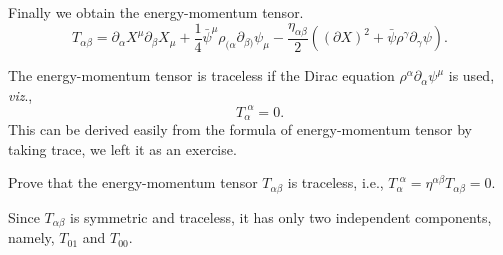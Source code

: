 \documentclass[graybox,envcountchap,sectrefs]{svmono}
\begin{document}
Finally we obtain the energy-momentum tensor.
\begin{equation}\boxed{
T_{\alpha\beta}=\partial_{\alpha} X^{\mu} \partial_{\beta} X_{\mu}
+\frac{1}{4} \bar{\psi}^{\mu} \rho_{(\alpha} \partial_{\beta)} \psi_{\mu}
-\frac{\eta_{\alpha \beta}}{2}\left((\partial X)^{2}+\bar{\psi} \rho^{\gamma} \partial_{\gamma} \psi\right).	}
\end{equation}


The energy-momentum tensor is traceless if the Dirac equation $\rho^{\alpha}\partial_{\alpha}\psi^{\mu}$ is used, \emph{viz}.,
\begin{equation}
T_{\alpha}^{\,\,\alpha}=0.	
\end{equation}
This can be derived easily from the formula of energy-momentum tensor by taking trace, we left it as an exercise.
\begin{exercise}
Prove that the energy-momentum tensor $T_{\alpha\beta}$ is traceless, i.e., $T_{\alpha}^{\,\,\alpha}=\eta^{\alpha\beta}T_{\alpha\beta}=0$.	
\end{exercise}

Since $T_{\alpha\beta}$ is symmetric and traceless, it has only two independent components, namely, $T_{01}$ and $T_{00}$.
\end{document}
